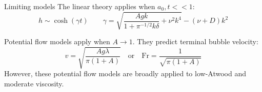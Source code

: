 \documentclass[12pt]{beamer}
\begin{document}
\begin{frame}{Limiting models}
The linear theory applies when $a_0, t << 1$:
\begin{equation*}
h \sim \cosh(\gamma t) \qquad \gamma = \sqrt{\frac{A g k}{1+\pi^{-1/2} k \delta} + \nu^2 k^4} - (\nu + D)k^2
\end{equation*}

Potential flow models apply when $A \rightarrow 1$.  They predict terminal bubble velocity:
\begin{equation*}
v = \sqrt{\frac{A g \lambda}{\pi (1+A)}} \quad \text{or} \quad \text{Fr} = \frac{1}{\sqrt{\pi (1 + A)}}
\end{equation*}
However, these potential flow models are broadly applied to low-Atwood and moderate viscosity.
\end{frame}

\end{document}
